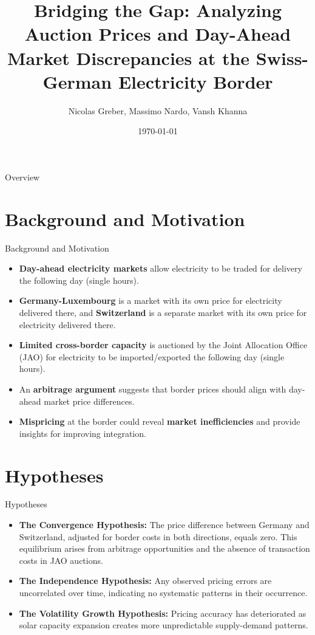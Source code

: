 \documentclass[aspectratio=169,xcolor=dvipsnames]{beamer}
\title[short title]{Bridging the Gap: Analyzing Auction Prices and Day-Ahead Market Discrepancies at the Swiss-German Electricity Border}
\author{Nicolas Greber, Massimo Nardo, Vansh Khanna}
\institute
{
    Department of Finance \\
    University of Zurich
    \vskip 3pt
}
\date{\today}
\begin{document}
\begin{frame}
    \titlepage
\end{frame}

\begin{frame}{Overview}
    \tableofcontents


\end{frame}

\section{Background and Motivation}
\begin{frame}{Background and Motivation}
\begin{itemize}
    \item \textbf{Day-ahead electricity markets} allow electricity to be traded for delivery the following day (single hours).
    \item \textbf{Germany-Luxembourg} is a market with its own price for electricity delivered there, and \textbf{Switzerland} is a separate market with its own price for electricity delivered there.
    \item \textbf{Limited cross-border capacity} is auctioned by the Joint Allocation Office (JAO) for electricity to be imported/exported the following day (single hours).
    \item An \textbf{arbitrage argument} suggests that border prices should align with day-ahead market price differences.
    \item \textbf{Mispricing} at the border could reveal \textbf{market inefficiencies} and provide insights for improving integration.
\end{itemize}
\end{frame}


\section{Hypotheses}
\begin{frame}{Hypotheses}
\begin{itemize}
    \item \textbf{The Convergence Hypothesis:}  
    The price difference between Germany and Switzerland, adjusted for border costs in both directions, equals zero. This equilibrium arises from arbitrage opportunities and the absence of transaction costs in JAO auctions.
    
    \item \textbf{The Independence Hypothesis:}  
    Any observed pricing errors are uncorrelated over time, indicating no systematic patterns in their occurrence.
    
    \item \textbf{The Volatility Growth Hypothesis:}  
    Pricing accuracy has deteriorated as solar capacity expansion creates more unpredictable supply-demand patterns.
\end{itemize}
\end{frame}
\end{document}
